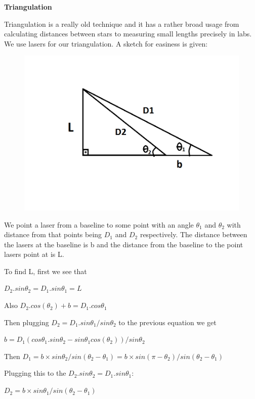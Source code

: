 \documentclass[10pt,a4paper]{article}
\begin{document}
{\textbf{\small{Triangulation}}
\par Triangulation is a really old technique and it has a rather broad usage from calculating distances between stars to measuring small lengths precisely in labs. We use lasers for our triangulation. A sketch for easiness is given:
\begin{figure}[H]
	\begin{center}
		\includegraphics[scale=0.6]{d1d2.png}
	\end{center}
\end{figure}
\par We point a laser from a baseline to some point with an angle $\theta_1$ and $\theta_2$ with distance from that points being $D_1$ and $D_2$ respectively. The distance between the lasers at the baseline is b and the distance from the baseline to the point lasers point at is L. 
\par To find L, first we see that
\par $D_2.sin\theta_2=D_1.sin\theta_1=L$
\par Also $D_2.cos(\theta_2)+b=D_1.cos\theta_1$
\par Then plugging $D_2=D_1.sin\theta_1/sin\theta_2$ to the previous equation we get
\par $b=D_1(cos\theta_1.sin\theta_2-sin\theta_1cos(\theta_2))/sin\theta_2$
\par Then $D_1=b\times sin\theta_2/sin(\theta_2-\theta_1)=b\times sin(\pi-\theta_2)/sin(\theta_2-\theta_1)$
\par Plugging this to the $D_2.sin\theta_2=D_1.sin\theta_1$:
\par $D_2=b\times sin\theta_1/sin(\theta_2-\theta_1)$
}
\end{document}
